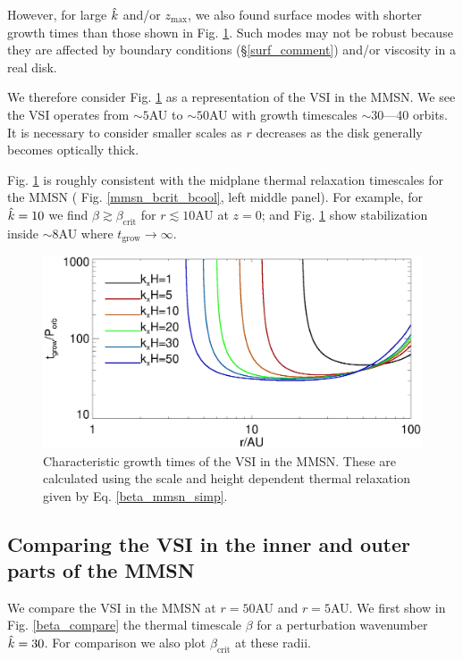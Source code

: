 However, for large $\hat{k}$ and/or $z_\mathrm{max}$, we also found
surface modes with shorter growth times than those shown in
Fig. \ref{mmsn_overall}. Such modes may not be robust because    
they are affected by boundary conditions (\S\ref{surf_comment}) and/or
viscosity in a real disk. 

We therefore consider Fig. \ref{mmsn_overall} as a representation of the
VSI in the MMSN. We see the VSI operates from $\sim 5$AU to $\sim
50$AU with growth timescales $\sim 30$---40 orbits. It is necessary to
consider smaller scales as $r$ decreases as the disk generally becomes
optically thick.  

Fig. \ref{mmsn_overall} is roughly consistent with the 
midplane thermal relaxation timescales for the MMSN ( 
Fig. \ref{mmsn_bcrit_bcool}, left middle panel). For example, for 
$\hat{k}=10$ we find $\beta \gtrsim \beta_\mathrm{crit}$ for $r\lesssim
10$AU at $z=0$; and Fig. \ref{mmsn_overall} show stabilization inside
$\sim 8$AU where $t_\mathrm{grow}\to\infty$.  

\begin{figure}
  \includegraphics[width=\linewidth]{figures/eigen_compare_grow.ps}
  \caption{Characteristic growth times of the VSI in
    the MMSN. These are calculated using the scale and height
    dependent thermal relaxation given by Eq. \ref{beta_mmsn_simp}. 
    \label{mmsn_overall}}    
\end{figure}

\subsection{Comparing the VSI in the inner and outer parts of the MMSN} 
We compare the VSI in the MMSN at $r=50$AU and $r=5$AU. We first show in
Fig. \ref{beta_compare}  the thermal timescale $\beta$ for a
perturbation wavenumber $\hat{k}=30$. For comparison we also plot
$\beta_\mathrm{crit}$ at these radii. 

